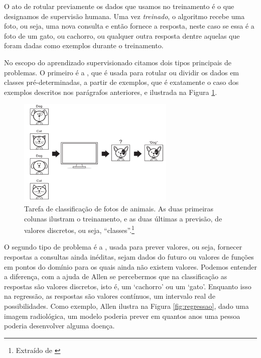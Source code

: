 O ato de rotular previamente os dados que usamos no treinamento é o que designamos de supervisão humana. Uma vez \emph{treinado}, o algoritmo recebe uma foto, ou seja, uma nova consulta e então fornece a resposta, neste caso se essa é a foto de um gato, ou cachorro, ou qualquer outra resposta dentre aquelas que foram dadas como exemplos durante o treinamento.

No escopo do aprendizado supervisionado citamos dois tipos principais de problemas. O primeiro é a , que é usada para rotular ou dividir os dados em classes pré-determinadas, a partir de exemplos, que é exatamente o caso dos exemplos descritos nos parágrafos anteriores, e ilustrada na Figura \ref{fig:classify}.

\begin{figure}[htb]
\centering
\includegraphics[width=7.5cm]{figuras/classificacao}
\caption{Tarefa de classificação de fotos de animais. As duas primeiras colunas ilustram o treinamento, e as duas últimas a previsão, de valores discretos, ou seja, ``classes''.\footnote{Extraído de \citep{allen}}}
\label{fig:classify}
\end{figure}

O segundo tipo de problema é a , usada para prever valores, ou seja, fornecer respostas a consultas ainda inéditas, sejam dados do futuro ou valores de funções em pontos do domínio para os quais ainda não existem valores. Podemos entender a diferença, com a ajuda de Allen \citep{allen} se percebermos que na classificação as respostas são valores discretos, isto é, um `cachorro' ou um `gato'. Enquanto isso na regressão, as respostas são valores contínuos, um intervalo real de possibilidades. Como exemplo, Allen \citep{allen} ilustra na Figura \ref{fig:regressao}, dado uma imagem radiológica, um modelo poderia prever em quantos anos uma pessoa poderia desenvolver alguma doença.


